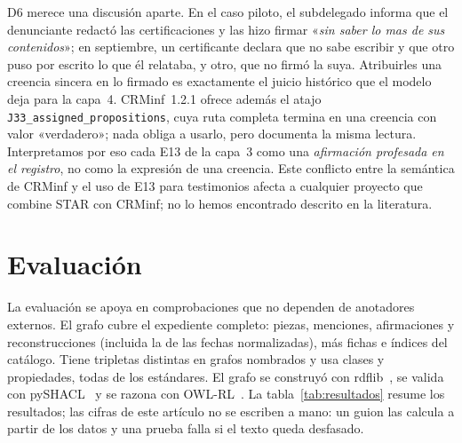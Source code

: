 \documentclass[runningheads]{llncs}
\newcommand{\ttt}[1]{\texttt{\small #1}}
\newcommand{\cita}[1]{«\textit{#1}»}
\begin{document}
D6 merece una discusión aparte. En el caso piloto, el subdelegado informa que el denunciante redactó las
certificaciones y las hizo firmar \cita{sin saber lo mas de sus contenidos}; en septiembre, un certificante declara
que no sabe escribir y que otro puso por escrito lo que él relataba, y otro, que no firmó la suya. Atribuirles una
creencia sincera en lo firmado es exactamente el juicio histórico que el modelo deja para la capa~4. CRMinf~1.2.1
ofrece además el atajo \ttt{J33\_assigned\_propositions}, cuya ruta completa termina en una creencia con valor
«verdadero»; nada obliga a usarlo, pero documenta la misma lectura. Interpretamos por eso cada E13 de la capa~3 como
una \emph{afirmación profesada en el registro}, no como la expresión de una creencia. Este conflicto entre la
semántica de CRMinf y el uso de E13 para testimonios afecta a cualquier proyecto que combine STAR con CRMinf; no lo
hemos encontrado descrito en la literatura.

\section{Evaluación}\label{sec:evaluacion}

La evaluación se apoya en comprobaciones que no dependen de anotadores externos. El grafo cubre el expediente
completo: \cifraPiezas{} piezas, \cifraMenciones{} menciones, \cifraAfirmaciones{} afirmaciones y \cifraReconstruccionesConFechas{} reconstrucciones (incluida la de las fechas normalizadas),
más \cifraCatalogoRegistros{} fichas e índices del catálogo. Tiene \cifraTripletas{} tripletas distintas en \cifraGrafos{} grafos nombrados y usa \cifraClases{} clases y \cifraPropiedades{}
propiedades, todas de los estándares. El grafo se
construyó con rdflib~\cite{rdflib}, se valida con pySHACL~\cite{pyshacl} y se razona con OWL-RL~\cite{owlrl}. La
tabla~\ref{tab:resultados} resume los resultados; las cifras de este artículo no se escriben a mano: un guion las calcula a partir de los datos y una prueba falla si el texto queda desfasado.
\end{document}
